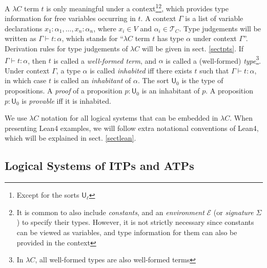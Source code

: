   A $\lambda C$ term $t$ is only meaningful under a context\footnote{Except for 
  the sorts $\mathsf{U}_\ell$}\footnote{It is common to also include \textit{constants},
  and an \textit{environment} $\mathcal{E}$ (or \textit{signature} $\Sigma$) to specify their
  types. However, it is not strictly necessary since constants can be viewed as variables,
  and type information for them can also be provided in the context}, which provides type information
  for free variables occurring in $t$. A context $\Gamma$ is a list of variable declarations
  $x_1 : \alpha_1, \dots, x_n : \alpha_n$, where $x_i \in V$ and $\alpha_i \in \mathcal{T}_C$.
  Type judgements will be written as $\Gamma \vdash t : \alpha$, which stands for ``$\lambda C$ term $t$
  has type $\alpha$ under context $\Gamma$''. Derivation rules for type judgements of
  $\lambda C$ will be given in sect. \ref{sectpts}. If $\Gamma \vdash t : \alpha$, then $t$ is
  called a \textit{well-formed term}, and $\alpha$ is called a (well-formed)
  \textit{type}\footnote{In $\lambda C$, all well-formed types are also well-formed terms}.
  Under context $\Gamma$, a type $\alpha$ is called \textit{inhabited} iff there exists $t$ such
  that $\Gamma \vdash t : \alpha$, in which case $t$ is called an \textit{inhabitant} of $\alpha$.
  The sort $\mathsf{U}_0$ is the type of propositions. A \textit{proof} of a proposition
  $p : \mathsf{U}_0$ is an inhabitant of $p$. A proposition $p : \mathsf{U}_0$ is \textit{provable}
  iff it is inhabited.

  We use $\lambda C$ notation for all logical systems that can be embedded in $\lambda C$.
  When presenting Lean4 examples, we will follow extra notational conventions
  of Lean4, which will be explained in sect. \ref{sectlean}.

\subsection{Logical Systems of ITPs and ATPs}\label{sublogsys}

